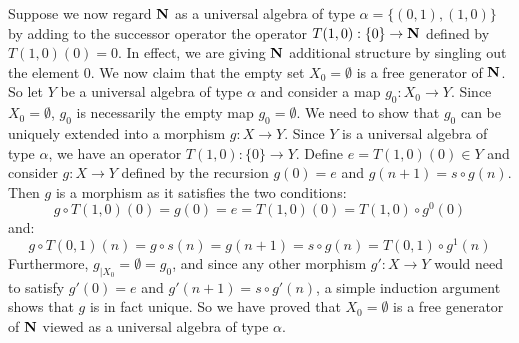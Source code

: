 Suppose we now regard $\mbox{$\bf N$}$ as a universal algebra of type
$\alpha=\{(0,1),(1,0)\}$ by adding to the successor operator the
operator $T(1,0):\{0\}\to\mbox{$\bf N$}$ defined by $T(1,0)(0) = 0$. In effect,
we are giving $\mbox{$\bf N$}$ additional structure by singling out the element
$0$. We now claim that the empty set $X_{0}=\emptyset$ is a free
generator of $\mbox{$\bf N$}$. So let $Y$ be a universal algebra of type
$\alpha$ and consider a map $g_{0}:X_{0}\to Y$. Since
$X_{0}=\emptyset$, $g_{0}$ is necessarily the empty map
$g_{0}=\emptyset$. We need to show that $g_{0}$ can be uniquely
extended into a morphism $g:X\to Y$. Since $Y$ is a universal
algebra of type $\alpha$, we have an operator $T(1,0):\{0\}\to Y$.
Define $e=T(1,0)(0)\in Y$ and consider $g:X\to Y$ defined by the
recursion $g(0)=e$ and $g(n+1)=s\circ g(n)$. Then $g$ is a morphism
as it satisfies the two conditions:
    \[
    g\circ T(1,0)(0) = g(0) = e = T(1,0)(0) =T(1,0)\circ g^{0}(0)
    \]
and:
    \[
    g\circ T(0,1)(n) = g\circ s(n)= g(n+1)=s\circ g(n) = T(0,1)\circ g^{1}(n)
    \]
Furthermore, $g_{|X_{0}}=\emptyset = g_{0}$, and since any other
morphism $g':X\to Y$ would need to satisfy $g'(0)=e$ and
$g'(n+1)=s\circ g'(n)$, a simple induction argument shows that $g$
is in fact unique. So we have proved that $X_{0}=\emptyset$ is a
free generator of $\mbox{$\bf N$}$ viewed as a universal algebra of type
$\alpha$.

